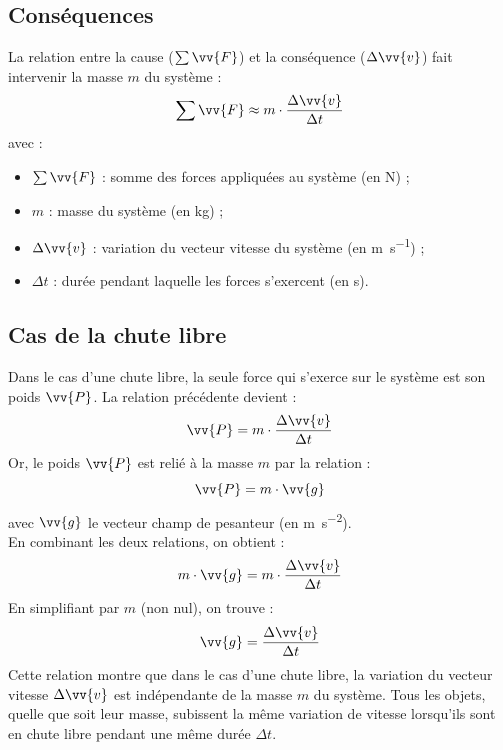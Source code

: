 \documentclass[a4paper,11pt,fleqn]{scrartcl}%
\begin{document}
    \subsection{Conséquences}
    La relation entre la cause ($\sum \vv{F}$) et la conséquence ($\Delta \vv{v}$) fait intervenir la masse $m$ du système :
    $$\sum \vv{F} \approx m \cdot \dfrac{\Delta \vv{v}}{\Delta t}$$
    avec :
    \begin{itemize}
        \item $\sum \vv{F}$ : somme des forces appliquées au système (en \unit{\newton}) ;
        \item $m$ : masse du système (en \unit{\kilogram}) ;
        \item $\Delta \vv{v}$ : variation du vecteur vitesse du système (en \unit{\meter\per\second}) ;
        \item $\Delta t$ : durée pendant laquelle les forces s'exercent (en \unit{\second}).
    \end{itemize}
    \subsection{Cas de la chute libre}
    Dans le cas d'une chute libre, la seule force qui s'exerce sur le système est son poids $\vv{P}$. La relation précédente devient :
    $$\vv{P} = m \cdot \dfrac{\Delta \vv{v}}{\Delta t}$$
    Or, le poids $\vv{P}$ est relié à la masse $m$ par la relation :
    $$\vv{P} = m \cdot \vv{g}$$
    avec $\vv{g}$ le vecteur champ de pesanteur (en \unit{\meter\per\second\squared}).\\
    En combinant les deux relations, on obtient :
    $$m \cdot \vv{g} = m \cdot \dfrac{\Delta \vv{v}}{\Delta t}$$
    En simplifiant par $m$ (non nul), on trouve :
    $$\vv{g} = \dfrac{\Delta \vv{v}}{\Delta t}$$
    Cette relation montre que dans le cas d'une chute libre, la variation du vecteur vitesse $\Delta \vv{v}$ est indépendante de la masse $m$ du système. Tous les objets, quelle que soit leur masse, subissent la même variation de vitesse lorsqu'ils sont en chute libre pendant une même durée $\Delta t$.
\end{document}
